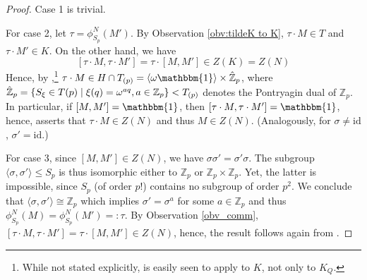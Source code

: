 \documentclass[aps,pra,letterpaper,onrcolumn,nofootinbib,notitlepage,longbibliography]{revtex4-1}
\newcommand{\mf}[1]{#1}
\newcommand{\one}{\mathbbm{1}}
\newcommand{\id}{\mathrm{id}}
\newcommand{\zz}{\mathbb Z}
\newcommand{\Z}{\mathbb Z}
\newcommand{\suchthat}{\;\ifnum\currentgrouptype=16 \middle\fi|\;}
\begin{document}
\begin{proof}
    Case 1 is trivial.
    
    For case 2, let $\tau=\phi^N_{S_p}(M')$. By Observation \ref{obv:tildeK to K}, $\tau\cdot M\in T$ and $\tau\cdot M'\in K$. On the other hand, we have
    $$[\tau\cdot M,\tau\cdot M']=\tau\cdot[M,M']\in Z(K)=Z(N)$$
    Hence, by \cite[Lm.~4]{FrembsChungOkay2022},\footnote{While not stated explicitly, \cite[Lm.~4]{FrembsChungOkay2022} is easily seen to apply to $K$, not only to $K_Q$.} $\tau\cdot M\in H\cap T_{(p)}=\langle\omega\one\rangle\times\hat{\Z}_p$, \mf{where $\hat{\Z}_p=\{S_\xi\in T(p)\suchthat \xi(q)=\omega^{aq}, a\in \Z_p\}<T_{(p)}$ denotes the Pontryagin dual of $\zz_p$}. In particular, if $[M,M']=\one$, then $[\tau\cdot M,\tau\cdot M']=\one$, hence, \cite[Lm.~4]{FrembsChungOkay2022} asserts that $\tau\cdot M\in Z(N)$ and thus $M\in Z(N)$. (Analogously, for $\sigma\neq\id$, $\sigma'=\id$.)

    For case 3, since $[M,M']\in Z(N)$, we have $\sigma\sigma'=\sigma'\sigma$. The subgroup $\langle \sigma,\sigma'\rangle\leq S_p$ is thus isomorphic either to $\Z_p$ or $\Z_p\times \Z_p$. Yet, the latter is impossible, since $S_p$ (of order $p!$) contains no subgroup of order $p^2$. We conclude that $\langle\sigma,\sigma'\rangle\cong\Z_p$ which implies $\sigma'=\sigma^a$ for some $a\in\zz_p$ and thus $\phi^N_{S_p}(M)=\phi^N_{S_p}(M')=:\tau$. By Observation \ref{obv_comm}, $[\tau\cdot M,\tau\cdot M']=\tau\cdot[M,M']\in Z(N)$, hence, the result follows again from \cite[Lemma 4]{FrembsChungOkay2022}.
\end{proof}
\end{document}
